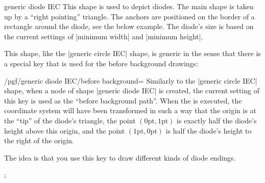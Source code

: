 \begin{shape}{generic diode IEC}
    This shape is used to depict diodes. The main shape is taken up by a
    ``right pointing'' triangle. The anchors are positioned on the border of a
    rectangle around the diode, see the below example. The diode's size is
    based on the current settings of |minimum width| and |minimum height|.
\begin{codeexample}[]
\end{codeexample}

    This shape, like the |generic circle IEC| shape, is generic in the sense
    that there is a special key that is used for the before background
    drawings:
    \begin{key}{/pgf/generic diode IEC/before background=}
        Similarly to the |generic circle IEC| shape, when a node of shape
        |generic diode IEC| is created, the current setting of this key is used
        as the ``before background path''. When the  is executed,
        the coordinate system will have been transformed in such a way that the
        origin is at the ``tip'' of the diode's triangle, the point
        $(0\mathrm{pt},1\mathrm{pt})$ is exactly half the diode's height above
        this origin, and the point $(1\mathrm{pt},0\mathrm{pt})$ is half the
        diode's height to the right of the origin.

        The idea is that you use this key to draw different kinds of diode
        endings.
\begin{codeexample}[]
\tikz \node [minimum size=1cm,generic diode IEC,
             /pgf/generic diode IEC/before background={
               \pgfpathmoveto{\pgfqpoint{-.5pt}{-1pt}}
               \pgfpathlineto{\pgfqpoint{.5pt}{-1pt}}
               \pgfpathmoveto{\pgfqpoint{0pt}{-1pt}}
               \pgfpathlineto{\pgfqpoint{0pt}{1pt}}
               \pgfpathmoveto{\pgfqpoint{-.5pt}{1pt}}
               \pgfpathlineto{\pgfqpoint{.5pt}{1pt}}
               \pgfusepathqstroke
             },
             draw] {};
\end{codeexample}
    \end{key}
\end{shape}

